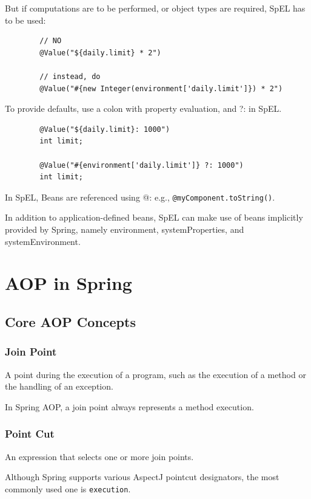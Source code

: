 \documentclass{scrartcl}
\begin{document}
    But if computations are to be performed, or object types are required, SpEL has to be used:

    \begin{lstlisting}
        // NO
        @Value("${daily.limit} * 2")

        // instead, do
        @Value("#{new Integer(environment['daily.limit']}) * 2")
    \end{lstlisting}

    To provide defaults, use a colon with property evaluation, and ?: in SpEL.

    \begin{lstlisting}
        @Value("${daily.limit}: 1000")
        int limit;

        @Value("#{environment['daily.limit']} ?: 1000")
        int limit;
    \end{lstlisting}

    In SpEL, Beans are referenced using @: e.g., \lstinline|@myComponent.toString()|.

    In addition to application-defined beans, SpEL can make use of beans implicitly provided by Spring, namely environment, systemProperties, and systemEnvironment.

\section{AOP in Spring}

\subsection{Core AOP Concepts}

\subsubsection{Join Point}

A point during the execution of a program, such as the execution of a method or the handling of an exception.

In Spring AOP, a join point always represents a method execution.


\subsubsection{Point Cut}

An expression that selects one or more join points.

Although Spring supports various AspectJ pointcut designators, the most commonly used one is \lstinline{execution}.
\end{document}
